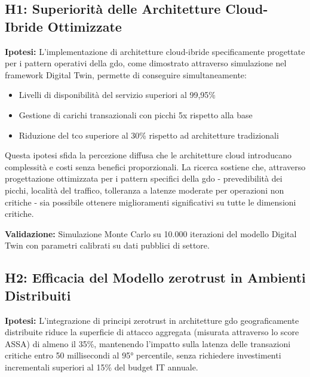 \subsection{\texorpdfstring{\textbf{H1: Superiorità delle Architetture Cloud-Ibride Ottimizzate}}{1.4.1 - H1: Superiorità delle Architetture Cloud-Ibride Ottimizzate}}
\label{subsec:h1}

\textbf{Ipotesi:} L'implementazione di architetture cloud-ibride specificamente progettate per i pattern operativi della \gls{gdo}, come dimostrato attraverso simulazione nel framework Digital Twin, permette di conseguire simultaneamente:
\begin{itemize}
\item Livelli di disponibilità del servizio superiori al 99,95\%
\item Gestione di carichi transazionali con picchi 5x rispetto alla base
\item Riduzione del \gls{tco} superiore al 30\% rispetto ad architetture tradizionali
\end{itemize}

Questa ipotesi sfida la percezione diffusa che le architetture cloud introducano complessità e costi senza benefici proporzionali. La ricerca sostiene che, attraverso progettazione ottimizzata per i pattern specifici della \gls{gdo} - prevedibilità dei picchi, località del traffico, tolleranza a latenze moderate per operazioni non critiche - sia possibile ottenere miglioramenti significativi su tutte le dimensioni critiche.

\textbf{Validazione:} Simulazione Monte Carlo su 10.000 iterazioni del modello Digital Twin con parametri calibrati su dati pubblici di settore.

\subsection{\texorpdfstring{\textbf{H2: Efficacia del Modello \gls{zerotrust} in Ambienti Distribuiti}}{1.4.2 - H2: Efficacia del Modello Zero Trust in Ambienti Distribuiti}}
\label{subsec:h2}

\textbf{Ipotesi:} L'integrazione di principi \gls{zerotrust} in architetture \gls{gdo} geograficamente distribuite riduce la superficie di attacco aggregata (misurata attraverso lo score ASSA) di almeno il 35\%, mantenendo l'impatto sulla latenza delle transazioni critiche entro 50 millisecondi al 95° percentile, senza richiedere investimenti incrementali superiori al 15\% del budget IT annuale.

